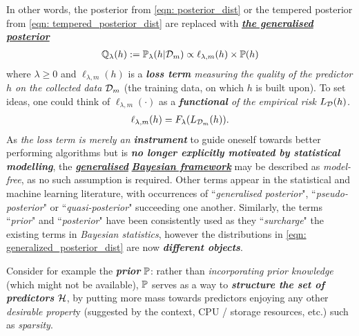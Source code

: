 \documentclass[11pt]{article}
\begin{document}
\begin{itemize}
\begin{remark}
In other words, the posterior from \eqref{eqn: posterior_dist} or the tempered posterior from \eqref{eqn: tempered_posterior_dist} are replaced with \underline{\emph{\textbf{the generalised posterior}}}
\begin{align}
{\mathbb Q}_{\lambda}(h) := {\mathbb P}_{\lambda}(h | {\mathcal D}_m) \propto \ell_{\lambda, m}(h)  \times {\mathbb P}(h) \label{eqn: generalized_posterior_dist}
\end{align} where $\lambda \ge 0$ and $\ell_{\lambda, m}(h)$ is a \emph{\textbf{loss term} measuring the quality of the predictor $h$ on the collected
data ${\mathcal D}_{m}$} (the training data, on which $h$ is built upon). To set ideas, one could think of $\ell_{\lambda, m}(\cdot)$ as a \emph{\textbf{functional} of the empirical risk $L_{{\mathcal D}}(h)$.}
\begin{align*}
\ell_{\lambda, m}(h) = F_{\lambda}(L_{{\mathcal D}_{m}}(h)).
\end{align*}  
As \emph{the loss term is merely an \textbf{instrument}} to guide oneself towards better performing algorithms but is \emph{\textbf{no longer explicitly motivated by statistical modelling}}, the \underline{\emph{\textbf{generalised}}} \underline{\emph{\textbf{Bayesian framework}}} may be described as \emph{model-free}, as no such assumption is required. Other terms appear in the statistical and machine learning literature, with  occurrences of ``\emph{generalised posterior}", ``\emph{pseudo-posterior}" or ``\emph{quasi-posterior}" succeeding one another. Similarly, the terms ``\emph{prior}" and ``\emph{posterior}" have been consistently used as they ``\emph{surcharge}" the existing terms in \emph{Bayesian statistics}, however the distributions in \eqref{eqn: generalized_posterior_dist} are now \textbf{\emph{different objects}}.

Consider for example the \emph{\textbf{prior}} ${\mathbb P}$: rather than \emph{incorporating prior knowledge} (which might not be available), ${\mathbb P}$ serves as a way to \emph{\textbf{structure the set of predictors} ${\mathcal H}$}, by putting more mass towards predictors enjoying any other \emph{desirable propert}y (suggested by the context, CPU / storage resources, etc.) such as \emph{sparsity}.
\end{remark}
\end{itemize}
\end{document}
